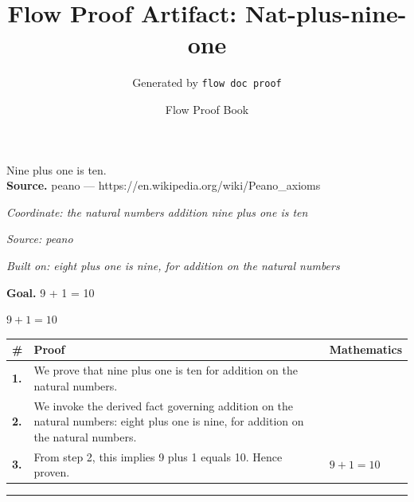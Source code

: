 \documentclass[11pt]{article}
\title{Flow Proof Artifact: Nat-plus-nine-one}
\author{Generated by \texttt{flow doc proof}}
\date{Flow Proof Book}
\theoremstyle{definition}
\begin{document}
\maketitle
Nine plus one is ten.\\[0.5em]
\textbf{Source.} peano — https://en.wikipedia.org/wiki/Peano\_axioms\\[0.5em]
\bigskip
{}\par
\smallskip\noindent\textit{Coordinate: the natural numbers \cdot addition \cdot nine plus one is ten}\par
\smallskip\noindent\textit{Source: peano}\par
\smallskip\noindent\textit{Built on: eight plus one is nine, for addition on the natural numbers}\par
\medskip
\noindent\textbf{Goal.} 9 + 1 = 10\par
\noindent$\displaystyle 9 + 1 = 10$\par
\medskip
\noindent
\begin{tabular}{@{} >{\raggedright\arraybackslash}p{} >{\raggedright\arraybackslash}p{} >{\raggedleft\arraybackslash}p{} @{}}
\textbf{\#} & \textbf{Proof} & \textbf{Mathematics} \\
\midrule
\textbf{1.} & We prove that nine plus one is ten for addition on the natural numbers. & \\[0.45em]
\textbf{2.} & We invoke the derived fact governing addition on the natural numbers: eight plus one is nine, for addition on the natural numbers. & \\[0.45em]
\textbf{3.} & From step 2, this implies 9 plus 1 equals 10. Hence proven. & $\displaystyle 9 + 1 = 10$ \\[0.45em]
\bottomrule
\end{tabular}
\label{thm:Nat-addition-nine_plus_one_is_ten}
\par\medskip\hrule
\end{document}
